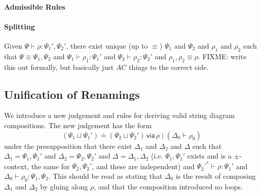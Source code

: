 \documentclass{amsart}
\let\types\vdash %
\def\cb{\mid} %
\let\mypm\pm
\def\pm{^\mypm}
\def\pms{\mypm}
\def\flip#1{#1^*} %
\newcommand\combine{,}
\newcommand\combineU{\sqcup}
\newcommand{\unif}[4]{#1\doteq #2\,\mathsf{ via }\,#3\cb #4}
\begin{document}
\paragraph{Admissible Rules}


\paragraph{Splitting} Given $\Psi \vdash \rho : \Psi_1' \combine \Psi_2'$, 
there exist unique (up to $\equiv$) $\Psi_1$ and $\Psi_2$ and $\rho_1$
and $\rho_2$ such that $\Psi \equiv \Psi_1 \combine \Psi_2$ and $\Psi_1
\vdash \rho_1 : \Psi_1'$ and $\Psi_2 \vdash \rho_2 : \Psi_2'$ and
$\rho_1 \combine \rho_2 \equiv \rho$.  FIXME: write this out formally,
but basically just $AC$ things to the correct side.

\subsection{Unification of Renamings}

We introduce a new judgement and rules for deriving valid string diagram
compositions. The new judgement has the form 
\[
\unif{(\Psi_1 \combineU \Psi_1')} {(\Psi_2 \combineU \Psi_2')} {\rho} {(\Delta_0 \vdash \rho_0)}
\]
under the presupposition that there exist $\Delta_1$ and $\Delta_2$ and
$\Delta$ such that $\Delta_1 = \Psi_1 \combine \Psi_1'$ and $\Delta_2 =
\Psi_2 \combine \Psi_2'$ and $\Delta = \Delta_1 \combine \Delta_2$
(i.e. $\Psi_1 \combine \Psi_1'$ exists and is a $\pms$-context, the same
for $\Psi_2 \combine \Psi_2'$, and these are independent) and
$\flip{\Psi_2'} \types \rho : \Psi_1'$ and $\Delta_0 \vdash \rho_0 :
\Psi_1 \combine \Psi_2$.  This should be read as stating that $\Delta_0$
is the result of composing $\Delta_1$ and $\Delta_2$ by gluing along
$\rho$, and that the composition introduced no loops.
\end{document}
